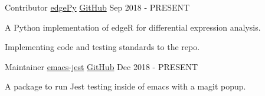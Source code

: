\begin{cventries}
	\cventry
	{Contributor} %
	{\href{https://github.com/r-bioinformatics/edgePy}{edgePy}} %
	{\href{https://github.com/r-bioinformatics/edgePy}{GitHub}} %
	{Sep 2018 - PRESENT} %
	{
		\begin{cvitems} %
			\item {A Python implementation of edgeR for differential expression analysis.}
			\item {Implementing code and testing standards to the repo.}
		\end{cvitems}
	}

	\cventry
	{Maintainer} %
	{\href{https://github.com/emiller88/emacs-jest}{emacs-jest}} %
	{\href{https://github.com/emiller88/emacs-jest}{GitHub}} %
	{Dec 2018 - PRESENT} %
	{
		\begin{cvitems} %
			\item {A package to run Jest testing inside of emacs with a magit popup.}
		\end{cvitems}
	}


\end{cventries}
